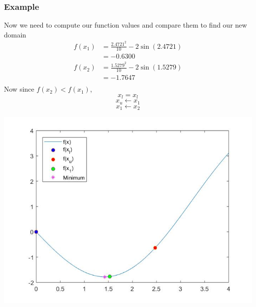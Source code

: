 \documentclass{if-beamer}
\begin{document}
\begin{frame}
	\frametitle{Example}
	\begin{minipage}{0.4\textwidth}
		Now we need to compute our function values and compare them to find our new domain
		\begin{align*}
			f(x_1) &= \frac{2.4721^2}{10}-2\sin(2.4721)\\
			&= -0.6300\\
			f(x_2) &= \frac{1.5279^2}{10}-2\sin(1.5279)\\
			& = -1.7647\\
		\end{align*}
		Now since $f(x_2)<f(x_1)$,
		$$ x_l = x_l $$
		$$ x_u \leftarrow x_1$$
		$$ x_1 \leftarrow x_2$$
		 
	\end{minipage}
	\begin{minipage}{0.6\textwidth}
		\centering
		\includegraphics[width = 1.2\textwidth]{figures/iter1half.jpg}
	\end{minipage}	
\end{frame}
\end{document}

